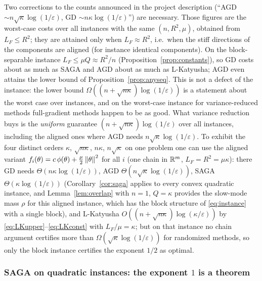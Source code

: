 Two corrections to the counts announced in the project description (``AGD $\sim n\sqrt\kappa\log(1/\varepsilon)$, GD $\sim n\kappa\log(1/\varepsilon)$'') are necessary. Those figures are the worst-case costs over all instances with the same $(n,R^2,\mu)$, obtained from $L_F\le R^2$; they are attained only when $L_F\approx R^2$, i.e.\ when the stiff directions of the components are aligned (for instance identical components). On the block-separable instance $L_F\le\mu Q\approx R^2/n$ (Proposition~\ref{prop:constants}), so GD costs about as much as SAGA and AGD about as much as L-Katyusha; AGD even attains the lower bound of Proposition~\ref{prop:anyseq}. This is not a defect of the instance: the lower bound $\Omega((n+\sqrt{n\kappa})\log(1/\varepsilon))$ is a statement about the worst case over instances, and on the worst-case instance for variance-reduced methods full-gradient methods happen to be as good. What variance reduction buys is the \emph{uniform} guarantee $(n+\sqrt{n\kappa})\log(1/\varepsilon)$ over all instances, including the aligned ones where AGD needs $n\sqrt\kappa\log(1/\varepsilon)$. To exhibit the four distinct orders $\kappa$, $\sqrt{n\kappa}$, $n\kappa$, $n\sqrt\kappa$ on one problem one can use the aligned variant $f_i(\theta)=c\,\phi(\theta)+\frac\mu2\left\|\theta\right\|^2$ for all $i$ (one chain in $\mathbb{R}^m$, $L_F=R^2=\mu\kappa$): there GD needs $\Theta(n\kappa\log(1/\varepsilon))$, AGD $\Theta(n\sqrt\kappa\log(1/\varepsilon))$, SAGA $\Theta(\kappa\log(1/\varepsilon))$ (Corollary~\ref{cor:saga} applies to every convex quadratic instance, and Lemma~\ref{lem:overlap} with $n=1$, $Q=\kappa$ provides the slow-mode mass $\rho$ for this aligned instance, which has the block structure of \eqref{eq:instance} with a single block), and L-Katyusha $O((n+\sqrt{n\kappa})\log(\kappa/\varepsilon))$ by \eqref{eq:LKupper}--\eqref{eq:LKconst} with $L_F/\mu=\kappa$; but on that instance no chain argument certifies more than $\Omega(\sqrt\kappa\log(1/\varepsilon))$ for randomized methods, so only the block instance certifies the exponent $1/2$ as optimal.

\subsubsection{SAGA on quadratic instances: the exponent \texorpdfstring{$1$}{1} is a theorem}

